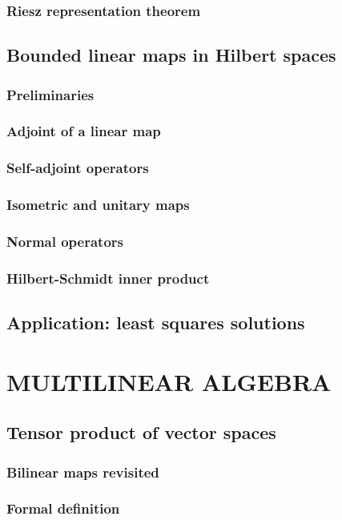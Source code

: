 \documentclass[a4paper,twoside]{article}
\theoremstyle{definition}
\theoremstyle{plain}
\begin{document}
\subsubsection{Riesz representation theorem}
\subsection{Bounded linear maps in Hilbert spaces}
\subsubsection{Preliminaries}
\subsubsection{Adjoint of a linear map}
\subsubsection{Self-adjoint operators}
\subsubsection{Isometric and unitary maps}
\subsubsection{Normal operators}
\subsubsection{Hilbert-Schmidt inner product}
\subsection{Application: least squares solutions}

\section{MULTILINEAR ALGEBRA}
\subsection{Tensor product of vector spaces}
\subsubsection{Bilinear maps revisited}
\subsubsection{Formal definition}
\end{document}
